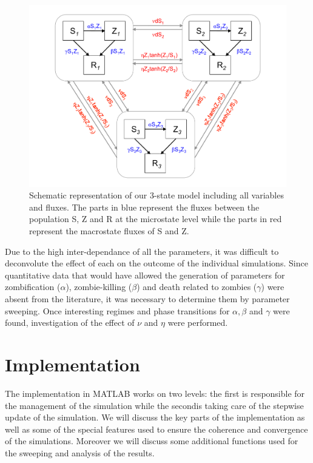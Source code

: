 \documentclass[11pt]{article} %
\begin{document}
\begin{figure}[h!]
\centerline{
\includegraphics[scale=0.45]{../images/Powerpoint_figures/total_model.pdf}}
\caption{Schematic representation of our 3-state model including all variables and fluxes. The parts in blue represent the fluxes between the population S, Z and R at the microstate level while the parts in red represent the macrostate fluxes of S and Z.\label{totalmodel} }
\end{figure}


Due to the high inter-dependance of all the parameters, it was difficult to deconvolute the effect of each on the outcome of the individual simulations. Since quantitative data that would have allowed the generation of parameters for zombification ($\alpha$), zombie-killing ($\beta$) and death related to zombies ($\gamma$) were absent from the literature, it was necessary to determine them by parameter sweeping. Once interesting regimes and phase transitions for $\alpha, \beta$ and $\gamma$ were found, investigation of the effect of $\nu$ and $\eta$ were performed.


\newpage
\section{Implementation}\indent

The implementation in MATLAB works on two levels: the first is responsible for the management of the simulation while the secondis taking care of the stepwise update of the simulation. We will discuss the key parts of the implementation as well as some of the special features used to ensure the coherence and convergence of the simulations. Moreover we will discuss some additional functions used for the sweeping and analysis of the results.
\end{document}
